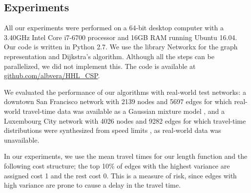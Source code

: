 \subsection{Experiments} \label{sec:exp}
All our experiments were performed on a 64-bit desktop computer with a 3.40GHz Intel Core i7-6700 processor and 16GB RAM running Ubuntu 16.04.
Our code is written in Python 2.7.
We use the library Networkx for the graph representation and Dijkstra's algorithm.
Although all the steps can be parallelized, we did not implement this.
The code is available at \url{github.com/albvera/HHL_CSP}.

We evaluated the performance of our algorithms with real-world test networks: a downtown San Francisco network with 2139 nodes and 5697 edges for which real-world travel-time data was available as a Gaussian mixture model \cite{sf_data}, and a Luxembourg City network with 4026 nodes and 9282 edges for which travel-time distributions were synthesized from speed limits \cite{niknami2016tractable}, as real-world data was unavailable.
 
In our experiments, we use the mean travel times for our length function and the following cost structure; the top 10\% of edges with the highest variance are assigned cost 1 and the rest cost 0.
This is a measure of risk, since edges with high variance are prone to cause a delay in the travel time.


